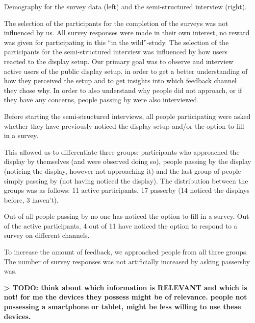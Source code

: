 		\begin{table}[h]

			

			\caption[Demographics of Field Study]{Demography for the survey data (left) and the semi-structured interview (right).}
			\label{table:demographics}
		\end{table}


		The selection of the participants for the completion of the surveys was not influenced by us. All survey responses were made in their own interest, no reward was given for participating in this ``in the wild''-study.
		The selection of the participants for the semi-structured interview was influenced by how users reacted to the display setup. Our primary goal was to observe and interview active users of the public display setup, in order to get a better understanding of how they perceived the setup and to get insights into which feedback channel they chose why. In order to also understand why people did not approach, or if they have any concerns, people passing by were also interviewed. 

		
		Before starting the semi-structured interviews, all people participating were asked whether they have previously noticed the display setup and/or the option to fill in a survey. 

		This allowed us to differentiate three groups: participants who approached the display by themselves (and were observed doing so), people passing by the display (noticing the display, however not approaching it) and the last group of people simply passing by (not having noticed the display). The distribution between the groups was as follows: 11 active participants, 17 passerby (14 noticed the displays before, 3 haven't). 

		Out of all people passing by no one has noticed the option to fill in a survey. Out of the active participants, 4 out of 11 have noticed the option to respond to a survey on different channels.

		To increase the amount of feedback, we approached people from all three groups. The number of survey responses was not artificially increased by asking passersby was.


		\textbf{> TODO: think about which information is RELEVANT and which is not! for me the devices they possess might be of relevance. people not possessing a smartphone or tablet, might be less willing to use these devices.} 
		

